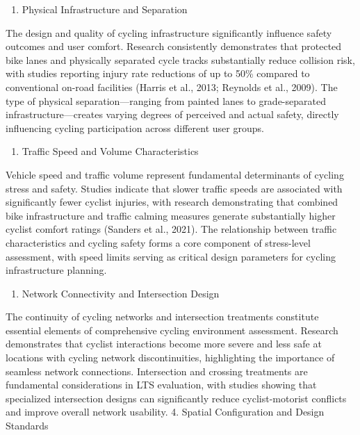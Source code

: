 \documentclass[
  12pt,
  oneside]{book}
\providecommand{\tightlist}{%
  \setlength{\itemsep}{0pt}\setlength{\parskip}{0pt}}
\begin{document}
\begin{enumerate}
\def\labelenumi{\arabic{enumi}.}
\tightlist
\item
  Physical Infrastructure and Separation
\end{enumerate}

The design and quality of cycling infrastructure significantly influence safety outcomes and user comfort. Research consistently demonstrates that protected bike lanes and physically separated cycle tracks substantially reduce collision risk, with studies reporting injury rate reductions of up to 50\% compared to conventional on-road facilities (Harris et al., 2013; Reynolds et al., 2009). The type of physical separation---ranging from painted lanes to grade-separated infrastructure---creates varying degrees of perceived and actual safety, directly influencing cycling participation across different user groups.

\begin{enumerate}
\def\labelenumi{\arabic{enumi}.}
\setcounter{enumi}{1}
\tightlist
\item
  Traffic Speed and Volume Characteristics
\end{enumerate}

Vehicle speed and traffic volume represent fundamental determinants of cycling stress and safety. Studies indicate that slower traffic speeds are associated with significantly fewer cyclist injuries, with research demonstrating that combined bike infrastructure and traffic calming measures generate substantially higher cyclist comfort ratings (Sanders et al., 2021). The relationship between traffic characteristics and cycling safety forms a core component of stress-level assessment, with speed limits serving as critical design parameters for cycling infrastructure planning.

\begin{enumerate}
\def\labelenumi{\arabic{enumi}.}
\setcounter{enumi}{2}
\tightlist
\item
  Network Connectivity and Intersection Design
\end{enumerate}

The continuity of cycling networks and intersection treatments constitute essential elements of comprehensive cycling environment assessment. Research demonstrates that cyclist interactions become more severe and less safe at locations with cycling network discontinuities, highlighting the importance of seamless network connections. Intersection and crossing treatments are fundamental considerations in LTS evaluation, with studies showing that specialized intersection designs can significantly reduce cyclist-motorist conflicts and improve overall network usability.
4. Spatial Configuration and Design Standards
\end{document}
